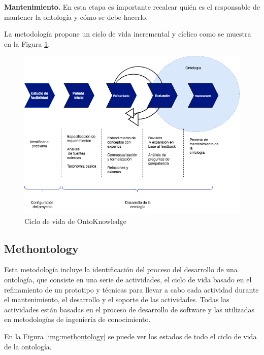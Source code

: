 \textbf{Mantenimiento.} En esta etapa es importante recalcar quién es el responsable de mantener la ontología y cómo se debe hacerlo.

La metodología propone un ciclo de vida incremental y cíclico como se muestra en la Figura \ref{img:ontoknowledge}.

\begin{figure}[h!]
    \centering
    \includegraphics[width=150mm]{figuras/Diagramas-OntoKnowledgeProcess}
    \caption{Ciclo de vida de OntoKnowledge}
    \label{img:ontoknowledge}
    \end{figure}

\subsection{Methontology}

Esta metodología incluye la identificación del proceso del desarrollo de una ontología, que consiste en una serie de actividades, el ciclo de vida basado en el refinamiento de un prototipo y técnicas para llevar a cabo cada actividad durante el mantenimiento, el desarrollo y el soporte de las actividades. Todas las actividades están basadas en el proceso de desarrollo de software y las utilizadas en metodologías de ingeniería de conocimiento.

En la Figura \ref{img:methontology} se puede ver los estados de todo el ciclo de vida de la ontología.

